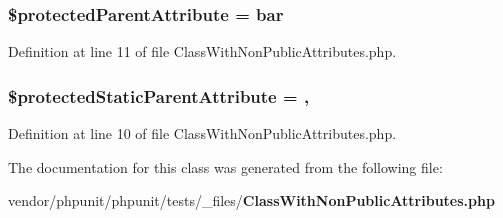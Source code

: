 \subsubsection[{\$protected\+Parent\+Attribute}]{\setlength{\rightskip}{0pt plus 5cm}\$protected\+Parent\+Attribute = \textquotesingle{}bar\textquotesingle{}\hspace{0.3cm}{\ttfamily [protected]}}\label{class_parent_class_with_protected_attributes_a315e746027141ad0ca38d2c635659c2e}


Definition at line 11 of file Class\+With\+Non\+Public\+Attributes.\+php.

\subsubsection[{\$protected\+Static\+Parent\+Attribute}]{\setlength{\rightskip}{0pt plus 5cm}\$protected\+Static\+Parent\+Attribute = \textquotesingle{}\hspace{0.3cm}{\ttfamily [static]}, {\ttfamily [protected]}}\label{class_parent_class_with_protected_attributes_ab02153534d362322b84e49ebb8eb166a}


Definition at line 10 of file Class\+With\+Non\+Public\+Attributes.\+php.



The documentation for this class was generated from the following file\+:\begin{DoxyCompactItemize}
\item 
vendor/phpunit/phpunit/tests/\+\_\+files/{\bf Class\+With\+Non\+Public\+Attributes.\+php}\end{DoxyCompactItemize}
